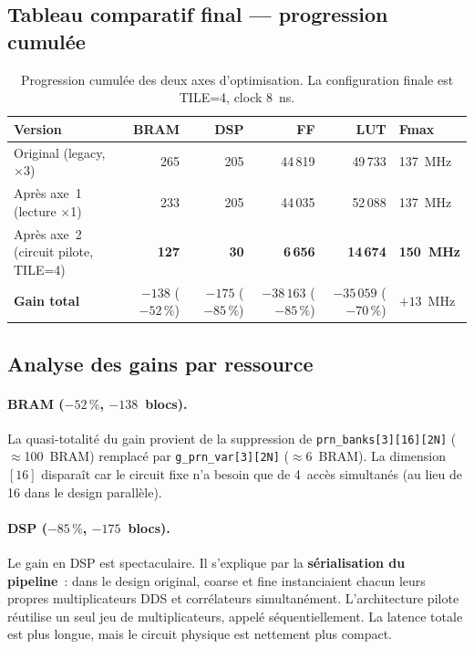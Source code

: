 \documentclass[11pt,a4paper]{article}
\begin{document}
\subsection{Tableau comparatif final --- progression cumulée}

\begin{table}[H]
\centering
\renewcommand{\arraystretch}{1.4}
\begin{tabular}{lrrrrl}
\toprule
\textbf{Version} & \textbf{BRAM} & \textbf{DSP} & \textbf{FF} & \textbf{LUT} & \textbf{Fmax} \\
\midrule
Original (legacy, ×3)               & 265 & 205 & 44\,819 & 49\,733 & 137~MHz \\
Après axe~1 (lecture ×1)            & 233 & 205 & 44\,035 & 52\,088 & 137~MHz \\
Après axe~2 (circuit pilote, TILE=4) & \textbf{127} & \textbf{30} & \textbf{6\,656} & \textbf{14\,674} & \textbf{150~MHz} \\
\midrule
\textbf{Gain total} &
$-138$ ($-52\,\%$) &
$-175$ ($-85\,\%$) &
$-38\,163$ ($-85\,\%$) &
$-35\,059$ ($-70\,\%$) &
$+13$~MHz \\
\bottomrule
\end{tabular}
\caption{Progression cumul\'ee des deux axes d'optimisation. La configuration finale est TILE=4, clock 8~ns.}
\end{table}

\subsection{Analyse des gains par ressource}

\paragraph{BRAM ($-52\,\%$, $-138$~blocs).}
La quasi-totalité du gain provient de la suppression de \texttt{prn\_banks[3][16][2N]} ($\approx$100~BRAM) remplacé par \texttt{g\_prn\_var[3][2N]} ($\approx$6~BRAM). La dimension $[16]$ disparaît car le circuit fixe n'a besoin que de 4~accès simultanés (au lieu de 16 dans le design parallèle).

\paragraph{DSP ($-85\,\%$, $-175$~blocs).}
Le gain en DSP est spectaculaire. Il s'explique par la \textbf{sérialisation du pipeline}~: dans le design original, coarse et fine instanciaient chacun leurs propres multiplicateurs DDS et corrélateurs simultanément. L'architecture pilote réutilise un seul jeu de multiplicateurs, appelé séquentiellement. La latence totale est plus longue, mais le circuit physique est nettement plus compact.
\end{document}

